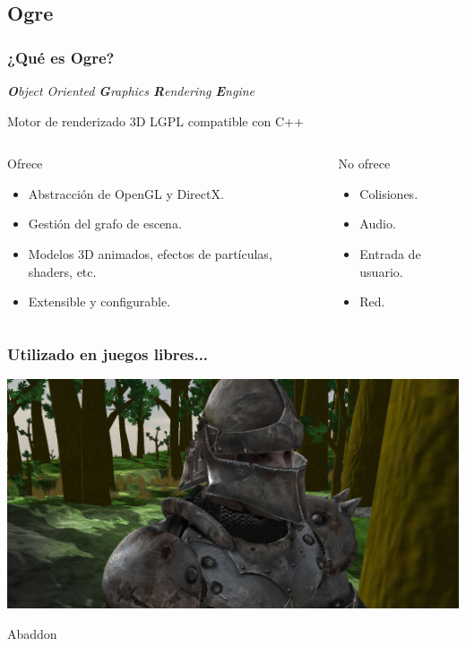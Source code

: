\documentclass[green]{beamer}
\begin{document}
\subsection{Ogre}
\begin{frame}
\transdissolve
    \frametitle{¿Qué es Ogre?}
    
    \begin{center}
	\emph{\textbf{\huge{O}}bject Oriented \textbf{\huge{G}}raphics \textbf{\huge{R}}endering \textbf{\huge{E}}ngine}
    \end{center}
    
    Motor de renderizado 3D LGPL compatible con C++
    
    \scriptsize{
    \begin{columns}[t]
    \column{150pt}
	\begin{block}{Ofrece}
            \begin{itemize}
                \item Abstracción de OpenGL y DirectX.
		\item Gestión del grafo de escena.
                \item Modelos 3D animados, efectos de partículas, shaders, etc.
                \item Extensible y configurable.
            \end{itemize}            
        \end{block}

    \column{150pt}
	\begin{alertblock}{No ofrece}
            \begin{itemize}
                \item Colisiones.
		\item Audio.
                \item Entrada de usuario.
                \item Red.
            \end{itemize}            
        \end{alertblock}
    \end{columns} 
    }
\end{frame}

\begin{frame}
    \frametitle{Utilizado en juegos libres...}
    
    \begin{center}
	\includegraphics[scale=0.18]{img/abaddon.jpg}
	    
	\tiny{Abaddon}
    \end{center}
\end{frame}
\end{document}
